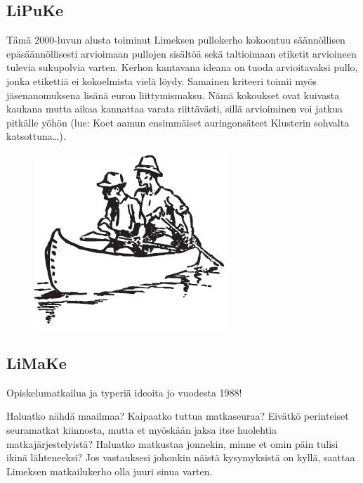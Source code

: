 \documentclass[a5paper, 8pt, twocolumn]{book} %
\numberwithin{equation}{section}
\begin{document}
\subsection*{LiPuKe}
Tämä 2000-luvun alusta toiminut Limeksen
pullokerho kokoontuu säännöllisen
epäsäännöllisesti arvioimaan pullojen
sisältöä sekä taltioimaan etiketit arvioineen
tulevia sukupolvia varten. Kerhon kantavana
ideana on tuoda arvioitavaksi pullo,
jonka etikettiä ei kokoelmista vielä löydy.
Samainen kriteeri toimii myös jäsenanomuksena
lisänä euron liittymismaksu.
Nämä kokoukset ovat kuivasta kaukana
mutta aikaa kannattaa varata riittävästi,
sillä arvioiminen voi jatkua pitkälle yöhön
(lue: Koet aamun ensimmäiset auringonsäteet
Klusterin sohvalta katsottuna\dots).

\begin{figure}[h!]
	\centering
	\includegraphics[width=0.8\columnwidth]{limake.png}
\end{figure}
\subsection*{LiMaKe}
Opiskelumatkailua ja typeriä ideoita jo
vuodesta 1988!

Haluatko nähdä maailmaa? Kaipaatko
tuttua matkaseuraa? Eivätkö perinteiset
seuramatkat kiinnosta, mutta et myöskään
jaksa itse huolehtia matkajärjestelyistä?
Haluatko matkustaa jonnekin, minne et
omin päin tulisi ikinä lähteneeksi? Jos vastauksesi
johonkin näistä kysymyksistä on
kyllä, saattaa Limeksen matkailukerho olla
juuri sinua varten.
\end{document}
